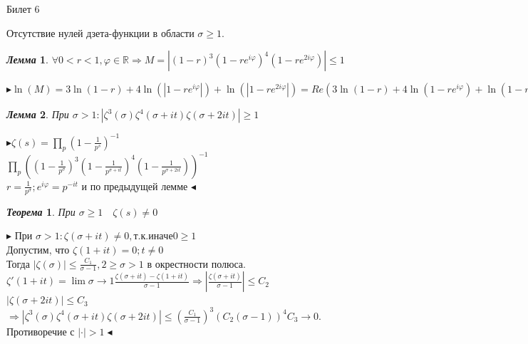 \documentclass[a4paper,12pt]{article}
\newtheorem{teo}{\textit{Теорема}}
\newtheorem{lem}{\textit{Лемма}}
\newcommand{\q}{\quad}
\newcommand{\pb}{\blacktriangleright}
\newcommand{\pe}{\blacktriangleleft}
\newcommand{\Ra}{\Rightarrow}
\newcommand{\bb}[1]{\mathbb{#1}}
\newcommand{\SL}{\sum\limits}
\newcommand{\os}{\left(}
\newcommand{\cs}{\right)}
\begin{document}
\newpage
\begin{mybox2}{\hypertarget{bil6}{Билет 6}}

\begin{formbox}{}
Отсутствие нулей дзета-функции в области $\sigma \ge 1$.
\end{formbox}
\begin{formbox}{}
\begin{lem} $\forall 0 < r < 1, \varphi\in \bb{R} \Ra M = \left| (1-r)^3(1-re^{i\varphi})^4 (1 - re^{2i\varphi}) \right| \le 1 $
\end{lem}
\end{formbox}
$\pb \ln(M) = 3\ln(1-r) + 4\ln(|1-re^{i\varphi}|) + \ln(|1 - re^{2i\varphi}|) = Re(3\ln(1-r) + 4\ln(1-re^{i\varphi}) + \ln(1 - re^{2i\varphi})) = -\SL_{n=1}^\infty \frac{r^n}{n}Re(3+4e^{in\varphi} + e^{2in\varphi}) = \SL_{n=1}^\infty \frac{r^n}{n} (3 + 4\cos(n\varphi) + \cos(2n\varphi)) = -2\SL_{n=1}^\infty \frac{r^n}{n} (\cos(n\varphi) + 1)^2 \pe  $\\

\begin{formbox}{}
\begin{lem} При $\sigma > 1: |\zeta^3(\sigma)\zeta^4(\sigma+it)\zeta(\sigma+2it)| \ge 1$
\end{lem}
\end{formbox}
$\pb\zeta(s) = \prod\limits_p \os 1 - \frac{1}{p^s} \cs ^{-1}$\\
$\prod\limits_p \os \os 1 - \frac{1}{p^\sigma} \cs^3 \os 1 - \frac{1}{p^{\sigma+it}} \cs^4 \os 1 - \frac{1}{p^{\sigma+2it}} \cs \cs^{-1}$\\
$r = \frac{1}{p^\sigma}; e^{i\varphi} = p^{-it}$ и по предыдущей лемме $\pe$



\begin{formbox}{}
\begin{teo} При $\sigma \ge 1 \q \zeta(s) \not= 0$
\end{teo}
\end{formbox}
$\pb$
При $\sigma > 1: \zeta(\sigma+it)\not=0, т.к. иначе 0\ge1$\\
Допустим, что $\zeta(1+it) = 0; t\not=0$\\
Тогда $|\zeta(\sigma)| \le \frac{C_1}{\sigma-1}, 2 \ge \sigma > 1 $ в окрестности полюса.\\
$\zeta'(1+it) = \lim\limits{\sigma\to1}\frac{\zeta(\sigma+it) - \zeta(1+it)}{\sigma-1}\Ra \left|\frac{\zeta(\sigma+it)}{\sigma-1}\right| \le C_2$\\
$|\zeta(\sigma+2it)| \le C_3$\\
$\Ra |\zeta^3(\sigma) \zeta^4(\sigma+it)\zeta(\sigma+2it)| \le \os \frac{C_1}{\sigma-1} \cs^3 (C_2(\sigma-1))^4 C_3 \to 0$. \\Противоречие с $|\cdot| > 1\pe$
\end{mybox2}
\end{document}
